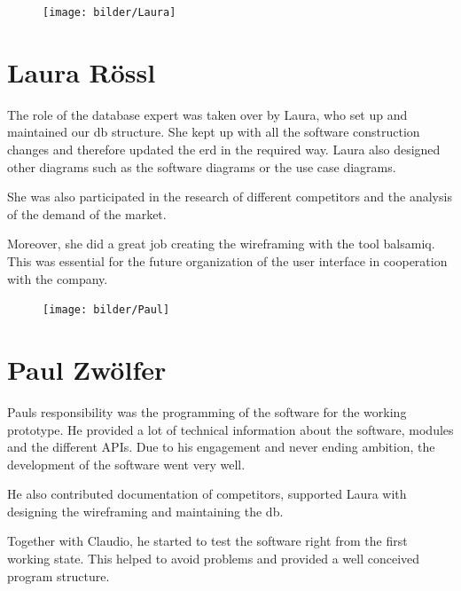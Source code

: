 \begin{figure}
    \texttt{[image: bilder/Laura]}
\end{figure}
\section*{Laura Rössl}
The role of the database expert was taken over by Laura, who set up and maintained our \gls{db} structure. She kept up with all the software construction changes and therefore updated the \gls{erd} in the required way. Laura also designed other diagrams such as the software diagrams or the use case diagrams. 

She was also participated in the research of different competitors and the analysis of the demand of the market.

Moreover, she did a great job creating the wireframing with the tool balsamiq. This was essential for the future organization of the user interface in cooperation with the company.
\begin{figure}
	\texttt{[image: bilder/Paul]}
\end{figure}
\section*{Paul Zwölfer}
Pauls responsibility was the programming of the software for the working prototype. He provided a lot of technical information about the software, modules and the different APIs. Due to his engagement and never ending ambition, the development of the software went very well.

He also contributed documentation of competitors, supported Laura with designing the wireframing and maintaining the \gls{db}.

Together with Claudio, he started to test the software right from the first working state. This helped to avoid problems and provided a well conceived program structure.
\recalctypearea